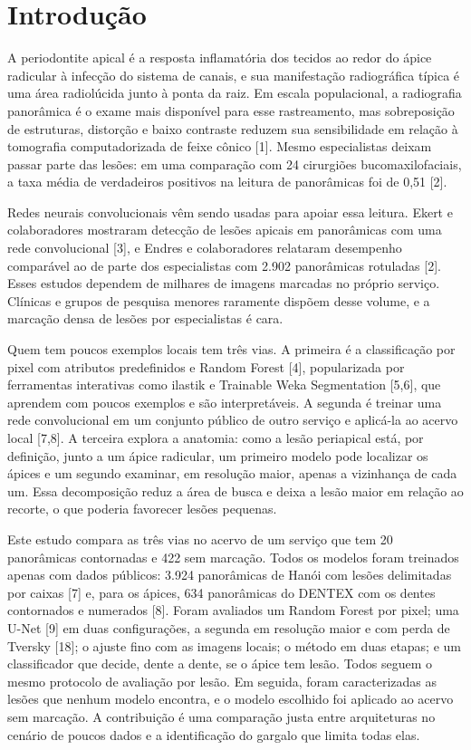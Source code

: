 \documentclass[twocolumn]{article}
\begin{document}
\section{Introdução}

A periodontite apical é a resposta inflamatória dos tecidos ao redor do ápice radicular à infecção do sistema de canais, e sua manifestação radiográfica típica é uma área radiolúcida junto à ponta da raiz. Em escala populacional, a radiografia panorâmica é o exame mais disponível para esse rastreamento, mas sobreposição de estruturas, distorção e baixo contraste reduzem sua sensibilidade em relação à tomografia computadorizada de feixe cônico [1]. Mesmo especialistas deixam passar parte das lesões: em uma comparação com 24 cirurgiões bucomaxilofaciais, a taxa média de verdadeiros positivos na leitura de panorâmicas foi de 0,51 [2].

Redes neurais convolucionais vêm sendo usadas para apoiar essa leitura. Ekert e colaboradores mostraram detecção de lesões apicais em panorâmicas com uma rede convolucional [3], e Endres e colaboradores relataram desempenho comparável ao de parte dos especialistas com 2.902 panorâmicas rotuladas [2]. Esses estudos dependem de milhares de imagens marcadas no próprio serviço. Clínicas e grupos de pesquisa menores raramente dispõem desse volume, e a marcação densa de lesões por especialistas é cara.

Quem tem poucos exemplos locais tem três vias. A primeira é a classificação por pixel com atributos predefinidos e Random Forest [4], popularizada por ferramentas interativas como ilastik e Trainable Weka Segmentation [5,6], que aprendem com poucos exemplos e são interpretáveis. A segunda é treinar uma rede convolucional em um conjunto público de outro serviço e aplicá-la ao acervo local [7,8]. A terceira explora a anatomia: como a lesão periapical está, por definição, junto a um ápice radicular, um primeiro modelo pode localizar os ápices e um segundo examinar, em resolução maior, apenas a vizinhança de cada um. Essa decomposição reduz a área de busca e deixa a lesão maior em relação ao recorte, o que poderia favorecer lesões pequenas.

Este estudo compara as três vias no acervo de um serviço que tem 20 panorâmicas contornadas e 422 sem marcação. Todos os modelos foram treinados apenas com dados públicos: 3.924 panorâmicas de Hanói com lesões delimitadas por caixas [7] e, para os ápices, 634 panorâmicas do DENTEX com os dentes contornados e numerados [8]. Foram avaliados um Random Forest por pixel; uma U-Net [9] em duas configurações, a segunda em resolução maior e com perda de Tversky [18]; o ajuste fino com as imagens locais; o método em duas etapas; e um classificador que decide, dente a dente, se o ápice tem lesão. Todos seguem o mesmo protocolo de avaliação por lesão. Em seguida, foram caracterizadas as lesões que nenhum modelo encontra, e o modelo escolhido foi aplicado ao acervo sem marcação. A contribuição é uma comparação justa entre arquiteturas no cenário de poucos dados e a identificação do gargalo que limita todas elas.
\end{document}

